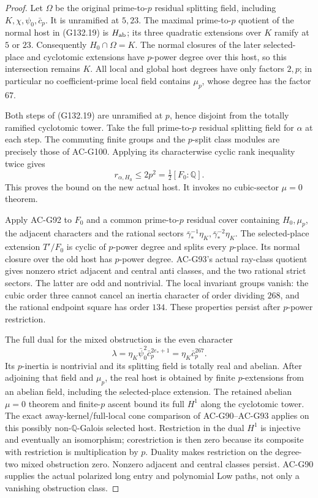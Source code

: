 \begin{proof}
Let \(\Omega\) be the original prime-to-\(p\) residual splitting
field, including \(K,\chi,\psi_0,\bar c_p\).
It is unramified at \(5,23\).
The maximal prime-to-\(p\) quotient of the normal host in
(G132.19) is \(H_{\rm ab}\); its three quadratic extensions
over \(K\) ramify at \(5\) or \(23\).
Consequently \(H_0\cap\Omega=K\).
The normal closures of the later selected-place and cyclotomic
extensions have \(p\)-power degree over this host, so this
intersection remains \(K\).
All local and global host degrees have only factors \(2,p\);
in particular no coefficient-prime local field contains
\(\mu_p\), whose degree has the factor \(67\).

Both steps of (G132.19) are unramified at \(p\), hence disjoint
from the totally ramified cyclotomic tower.
Take the full prime-to-\(p\) residual splitting field for
\(\alpha\) at each step.  The commuting finite groups and
the \(p\)-split class modules are precisely those of AC-G100.
Applying its characterwise cyclic rank inequality twice gives
\[
 r_{\alpha,H_0}\le2p^2
        =\tfrac12[F_0:\mathbb Q].
 \tag{G132.20}
\]
This proves the bound on the new actual host.  It invokes no
cubic-sector \(\mu=0\) theorem.

Apply AC-G92 to \(F_0\) and a common prime-to-\(p\) residual
cover containing \(H_0,\mu_p\), the adjacent characters and
the rational sectors
\(\bar\gamma_*^{-1}\eta_K,\bar\gamma_*^{-2}\eta_K\).
The selected-place extension \(T'/F_0\) is cyclic of
\(p\)-power degree and splits every \(p\)-place.
Its normal closure over the old host has \(p\)-power degree.
AC-G93's actual ray-class quotient gives nonzero strict
adjacent and central anti classes, and the two rational
strict sectors.  The latter are odd and nontrivial.
The local invariant groups vanish: the cubic order three
cannot cancel an inertia character of order dividing \(268\),
and the rational endpoint square has order \(134\).
These properties persist after \(p\)-power restriction.

The full dual for the mixed obstruction is the even character
\[
 \lambda=\eta_K\bar\psi_0^2\bar c_p^{2e_*+1}
         =\eta_K\bar c_p^{267}.
 \tag{G132.21}
\]
Its \(p\)-inertia is nontrivial and its splitting field is
totally real and abelian.  After adjoining that field and
\(\mu_p\), the real host is obtained by finite \(p\)-extensions
from an abelian field, including the selected-place extension.
The retained abelian \(\mu=0\) theorem and finite-\(p\) ascent
bound its full \(H^1\) along the cyclotomic tower.
The exact away-kernel/full-local cone comparison of
AC-G90--AC-G93 applies on this possibly non-\(\mathbb Q\)-Galois
selected host.  Restriction in the dual \(H^1\) is injective
and eventually an isomorphism; corestriction is then zero
because its composite with restriction is multiplication by
\(p\).  Duality makes restriction on the degree-two mixed
obstruction zero.  Nonzero adjacent and central classes
persist.  AC-G90 supplies the actual polarized long entry
and polynomial Low paths, not only a vanishing obstruction
class.


\end{proof}
